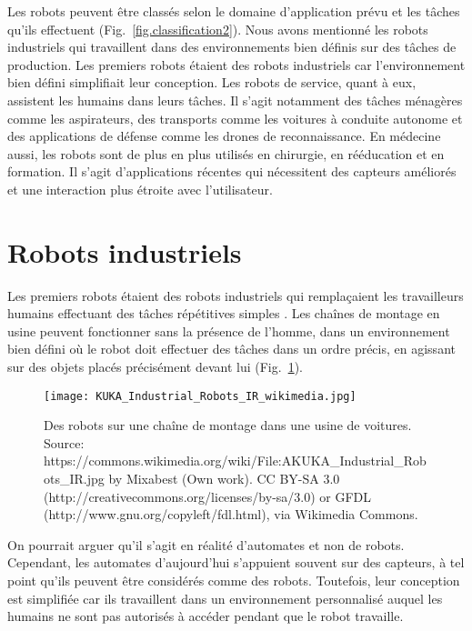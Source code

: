 Les robots peuvent être classés selon le domaine d'application prévu et les tâches qu'ils effectuent (Fig.~\ref{fig.classification2}). Nous avons mentionné les robots industriels qui travaillent dans des environnements bien définis sur des tâches de production. Les premiers robots étaient des robots industriels car l'environnement bien défini simplifiait leur conception.  Les robots de service, quant à eux, assistent les humains dans leurs tâches. Il s'agit notamment des tâches ménagères comme les aspirateurs, des transports comme les voitures à conduite autonome et des applications de défense comme les drones de reconnaissance. En médecine aussi, les robots sont de plus en plus utilisés en chirurgie, en rééducation et en formation. Il s'agit d'applications récentes qui nécessitent des capteurs améliorés et une interaction plus étroite avec l'utilisateur.

\section{Robots industriels}

Les premiers robots étaient des robots industriels qui remplaçaient les travailleurs humains effectuant des tâches répétitives simples . Les chaînes de montage en usine peuvent fonctionner sans la présence de l'homme, dans un environnement bien défini où le robot doit effectuer des tâches dans un ordre précis, en agissant sur des objets placés précisément devant lui (Fig.~\ref{fig.assemblyline}). 

\begin{figure}
\begin{center}
\texttt{[image: KUKA\_Industrial\_Robots\_IR\_wikimedia.jpg]}
\end{center}
\caption{Des robots sur une chaîne de montage dans une usine de voitures.
 Source: https://commons.wikimedia.org/wiki/File:AKUKA\_Industrial\_Robots\_IR.jpg by Mixabest (Own work). CC BY-SA 3.0 (http://creativecommons.org/licenses/by-sa/3.0) or GFDL (http://www.gnu.org/copyleft/fdl.html), via Wikimedia Commons.}\label{fig.assemblyline}
\end{figure}

On pourrait arguer qu'il s'agit en réalité d'automates et non de robots. Cependant, les automates d'aujourd'hui s'appuient souvent sur des capteurs, à tel point qu'ils peuvent être considérés comme des robots. Toutefois, leur conception est simplifiée car ils travaillent dans un environnement personnalisé auquel les humains ne sont pas autorisés à accéder pendant que le robot travaille.


